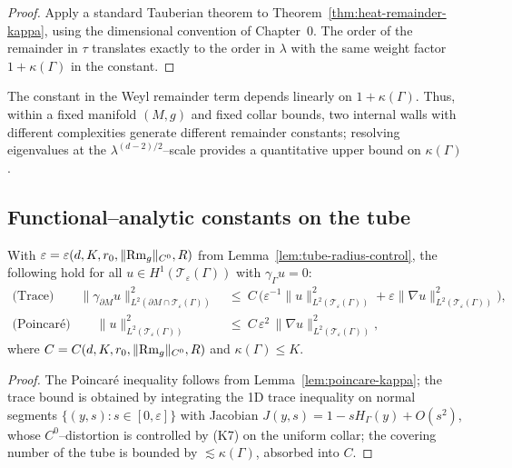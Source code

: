 \begin{proof}
Apply a standard Tauberian theorem to Theorem~\ref{thm:heat-remainder-kappa}, using the dimensional convention of Chapter~0. The order of the remainder in $\tau$ translates exactly to the order in $\lambda$ with the same weight factor $1+\kappa(\Gamma)$ in the constant.
\end{proof}

\begin{remark}
The constant in the Weyl remainder term depends linearly on $1+\kappa(\Gamma)$. Thus, within a fixed manifold $(M,g)$ and fixed collar bounds, two internal walls with different complexities generate different remainder constants; resolving eigenvalues at the $\lambda^{(d-2)/2}$–scale provides a quantitative upper bound on $\kappa(\Gamma)$.
\end{remark}

\subsection{Functional–analytic constants on the tube}
\label{subsec:fa-tube}

\begin{proposition}
\label{prop:trace-poincare-kappa}
With $\varepsilon=\varepsilon(d,K,r_0,\|{\rm Rm}_g\|_{C^0},R)$ from Lemma~\ref{lem:tube-radius-control}, the following hold for all $u\in H^1(\mathcal{T}_\varepsilon(\Gamma))$ with $\gamma_\Gamma u=0$:
\begin{align*}
\text{(Trace)}\qquad \|\gamma_{\partial M}u\|_{L^2(\partial M\cap\mathcal{T}_\varepsilon(\Gamma))}^2
&\ \le\ C\,\Big(\varepsilon^{-1}\|u\|_{L^2(\mathcal{T}_\varepsilon(\Gamma))}^2+\varepsilon\|\nabla u\|_{L^2(\mathcal{T}_\varepsilon(\Gamma))}^2\Big),\\[2mm]
\text{(Poincaré)}\qquad \|u\|_{L^2(\mathcal{T}_\varepsilon(\Gamma))}^2
&\ \le\ C\,\varepsilon^2\,\|\nabla u\|_{L^2(\mathcal{T}_\varepsilon(\Gamma))}^2,
\end{align*}
where $C=C(d,K,r_0,\|{\rm Rm}_g\|_{C^0},R)$ and $\kappa(\Gamma)\le K$.
\end{proposition}

\begin{proof}
The Poincaré inequality follows from Lemma~\ref{lem:poincare-kappa}; the trace bound is obtained by integrating the 1D trace inequality on normal segments $\{(y,s)\colon s\in[0,\varepsilon]\}$ with Jacobian $J(y,s)=1-sH_\Gamma(y)+O(s^2)$, whose $C^0$–distortion is controlled by (K7) on the uniform collar; the covering number of the tube is bounded by $\lesssim \kappa(\Gamma)$, absorbed into $C$.
\end{proof}

